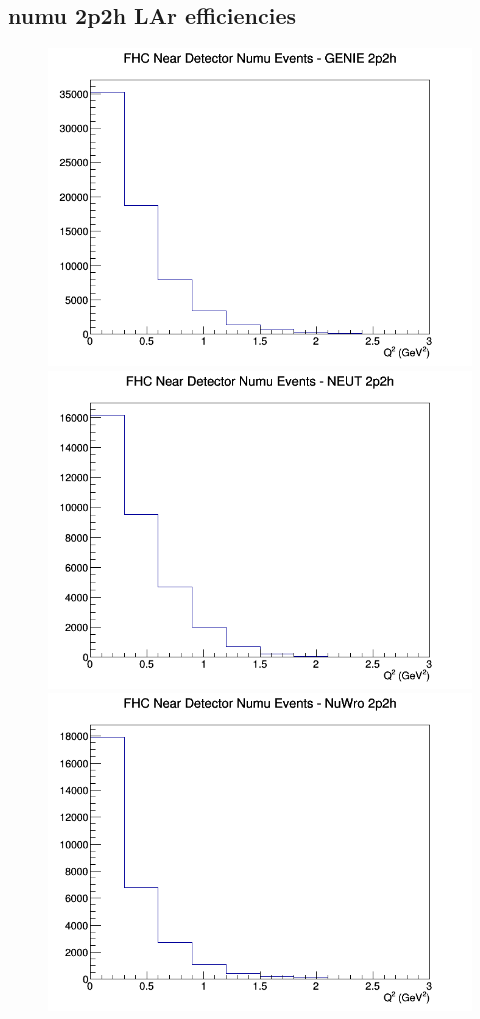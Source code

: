 \subsection{numu 2p2h LAr efficiencies}
\begin{figure}[h]
\includegraphics[width=\linewidth]{eff_Q2/LAr/2p2h_FHC_ND_numu_Q2_GENIE.png}
\endminipage
{}
\includegraphics[width=\linewidth]{eff_Q2/LAr/2p2h_FHC_ND_numu_Q2_NEUT.png}
\endminipage
{}
\includegraphics[width=\linewidth]{eff_Q2/LAr/2p2h_FHC_ND_numu_Q2_NuWro.png}

\end{figure}
